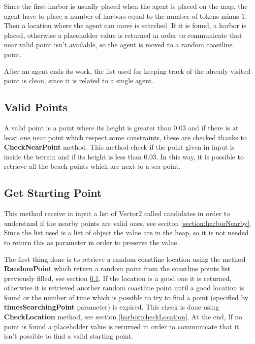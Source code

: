 \documentclass[12pt]{article}
\begin{document}
    Since the first harbor is usually placed when the agent is placed on the map, the agent have to place a number of harbors equal to the number of tokens minus 1. Then a 
    location where the agent can move is searched. If it is found, a harbor is placed, otherwise a placeholder value is returned in order to communicate that near valid point
    isn't available, so the agent is moved to a random coastline point.

    After an agent ends its work, the list used for keeping track of the already visited point is clean, since it is related to a single agent.

    \subsection{Valid Points} \label{section:HarborValidPoints}
    A valid point is a point where its height is greater than 0.03 and if there is at least one near point which respect some constraints, these are checked thanks to
    \textbf{CheckNearPoint} method. This method check if the point given in input is inside the terrain and if its height is less than 0.03. In this way, it is possible to
    retrieve all the beach points which are next to a sea point.

    \subsection{Get Starting Point} \label{section:harborStartingPoint}
    This method receive in input a list of Vector2 called candidates in order to understand if the nearby points are valid ones, see seciton \ref{section:harborNearby}. Since the list 
    used is a list of object the value are in the heap, so it is not needed to return this as parameter in order to preserve the value.

    The first thing done is to retrieve a random coastline location using the method \textbf{RandomPoint} which return a random point from the coastline points list previously
    filled, see section \ref{section:HarborValidPoints}. If the location is a good one it is returned, otherwise it is retrieved another random coastline point until a good
    location is found or the number of time which is possible to try to find a point (specified by \textbf{timesSearchingPoint} parameter) is expired.
    This check is done using \textbf{CheckLocation} method, see section \ref{harbor:checkLocation}. At the end, If no point is found a placeholder value is returned in order 
    to communicate that it isn't possible to find a valid starting point.
\end{document}
